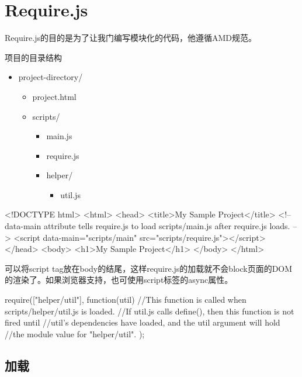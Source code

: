 \section{Require.js}
Require.js的目的是为了让我门编写模块化的代码，他遵循AMD规范。

项目的目录结构
\renewcommand{\labelitemi}{$\triangleright$}
\renewcommand{\labelitemii}{$\triangleright$}
\renewcommand{\labelitemiii}{$\triangleright$}
\renewcommand{\labelitemiv}{$\triangleright$}
\begin{itemize}
\item project-directory/
	\begin{itemize}
	\item project.html
	\item scripts/
		\begin{itemize}
		\item main.js
		\item require.js
		\item helper/
			\begin{itemize}
			\item util.js
			\end{itemize}
		\end{itemize}			
	\end{itemize}
\end{itemize}

\begin{HTML5}
<!DOCTYPE html>
<html>
    <head>
        <title>My Sample Project</title>
        <!-- data-main attribute tells require.js to load
             scripts/main.js after require.js loads. -->
        <script data-main="scripts/main" src="scripts/require.js"></script>
    </head>
    <body>
        <h1>My Sample Project</h1>
    </body>
</html>
\end{HTML5}
可以将script tag放在body的结尾，这样require.js的加载就不会block页面的DOM的渲染了。如果浏览器支持，也可使用script标签的async属性。

\begin{JavaScript}
require(["helper/util"], function(util) {
    //This function is called when scripts/helper/util.js is loaded.
    //If util.js calls define(), then this function is not fired until
    //util's dependencies have loaded, and the util argument will hold
    //the module value for "helper/util".
});
\end{JavaScript}

\subsection{加载}

